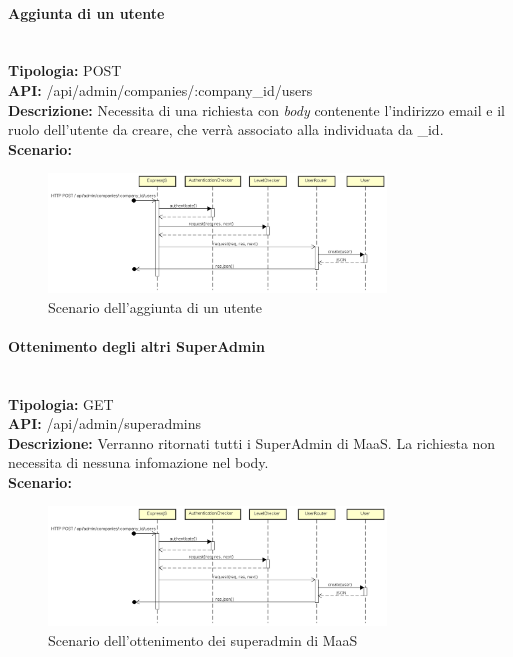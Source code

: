 \newpage
\paragraph{Aggiunta di un utente}\mbox{}\\
\textbf{Tipologia:} POST \\
\textbf{API:} /api/admin/companies/:company\_id/users \\
\textbf{Descrizione:} Necessita di una richiesta con \textit{body} contenente l'indirizzo email e il ruolo dell'utente da creare, che verrà associato alla  individuata da \_id. \\
\textbf{Scenario:} 
\begin{figure}[H]
\centering
\includegraphics[width=0.8\textwidth]{res/sections/backend/sequence/(POST)userSA.png}
\caption{Scenario dell'aggiunta di un utente}
\end{figure}

\newpage
\paragraph{Ottenimento degli altri SuperAdmin}\mbox{}\\
\textbf{Tipologia:} GET \\
\textbf{API:} /api/admin/superadmins \\
\textbf{Descrizione:} Verranno ritornati tutti i SuperAdmin di MaaS. La richiesta non necessita di nessuna infomazione nel body. \\
\textbf{Scenario:} 
\begin{figure}[H]
\centering
\includegraphics[width=0.8\textwidth]{res/sections/backend/sequence/(POST)userSA.png} %
\caption{Scenario dell'ottenimento dei superadmin di MaaS}
\end{figure}
